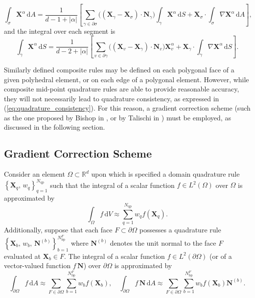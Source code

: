 	\begin{equation}
		\int_{\sigma} \bm{X}^\alpha \, \mathrm dA = \frac{1}{d-1+|\alpha|} \left[ \sum_{\gamma \in \partial \sigma} \big( (\bm{X}_\gamma-\bm{X}_\sigma) \cdot \bm{N}_{\gamma} \big) \int_{\gamma} \bm{X}^\alpha \, \mathrm dS + \bm{X}_\sigma \cdot \int_{\sigma} \nabla \bm{X}^\alpha \, \mathrm dA \right],
	\end{equation}
	and the integral over each segment is
	\begin{equation}
		\int_{\gamma} \bm{X}^\alpha \, \mathrm dS = \frac{1}{d-2+|\alpha|} \left[ \sum_{v \in \partial \gamma} \big( (\bm{X}_v-\bm{X}_\gamma) \cdot \bm{N}_{v} \big) \bm{X}^\alpha_v + \bm{X}_\gamma \cdot \int_{\gamma} \nabla \bm{X}^\alpha \, \mathrm dS \right].
	\end{equation}
	
	Similarly defined composite rules may be defined on each polygonal face of a given polyhedral element, or on each edge of a polygonal element. However, while composite mid-point quadrature rules are able to provide reasonable accuracy, they will not necessarily lead to quadrature consistency, as expressed in (\ref{eq:quadrature_consistency}). For this reason, a gradient correction scheme (such as the one proposed by Bishop in \cite{Bishop:14}, or by Talischi in \cite{Talischi:15}) must be employed, as discussed in the following section.
	
	\subsection*{Gradient Correction Scheme}
	
	Consider an element $\Omega \subset \mathbb{R}^d$ upon which is specified a domain quadrature rule $\left\{ \bm{X}_q, \, w_q \right\}_{q=1}^{N_{\mathrm q\mathrm p}}$ such that the integral of a scalar function $f \in L^2 (\Omega)$ over $\Omega$ is approximated by
	\begin{equation}
		\int_\Omega f \, \mathrm dV \approx \sum_{q=1}^{N_{\mathrm q\mathrm p}} w_q f(\bm{X}_q).
	\end{equation}
	Additionally, suppose that each face $F \subset \partial \Omega$ possesses a quadrature rule $\left\{ \bm{X}_b, \, w_b, \, \bm{N}^{(b)} \right\}_{b=1}^{N^{F}_{\mathrm b\mathrm p}}$ where $\bm{N}^{(b)}$ denotes the unit normal to the face $F$ evaluated at $\bm{X}_b \in F$. The integral of a scalar function $f \in L^2 (\partial \Omega)$ (or of a vector-valued function $f \, \bm{N}$) over $\partial \Omega$ is approximated by
	\begin{equation}
		\int_{\partial \Omega} f \, \mathrm dA \approx \sum_{F \in \partial \Omega} \sum_{b=1}^{N^F_{\mathrm b\mathrm p}} w_b f(\bm{X}_b), \quad \int_{\partial \Omega} f \, \bm{N} \, \mathrm dA \approx \sum_{F \in \partial \Omega} \sum_{b=1}^{N^F_{\mathrm b\mathrm p}} w_b f(\bm{X}_b) \bm{N}^{(b)}.
	\end{equation}
	
